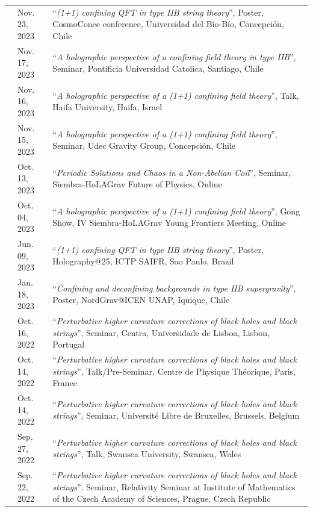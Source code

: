 \documentclass[11pt]{article}
\newenvironment{cvblock}[3]
{
\noindent
\begin{longtable}{p{#1}  >{\raggedright\arraybackslash}p{#2} p{#3}}
}
{
\end{longtable}
}
\newcommand{\cventry}[3]{\textbf{#1} & #2 & #3 \\ }
\newcommand{\talk}[2]{\small “\textit{#1}”, #2\vspace{0.2cm}}
\begin{document}
\begin{cvblock}{0cm}{2.3cm}{13cm}
	\cventry{}{\small Nov. 23, 2023}{\talk{(1+1) confining QFT in type IIB string theory}{Poster, CosmoConce conference, Universidad del Bío-Bío, Concepción, Chile}}

	\cventry{}{\small Nov. 17, 2023}{\talk{A holographic perspective of a confining field theory in type IIB}{Seminar, Pontificia Universidad Catolica, Santiago, Chile}}

	\cventry{}{\small Nov. 16, 2023}{\talk{A holographic perspective of a (1+1) confining field theory}{Talk, Haifa University, Haifa, Israel}}

	\cventry{}{\small Nov. 15, 2023}{\talk{A holographic perspective of a (1+1) confining field theory}{Seminar, Udec Gravity Group, Concepción, Chile}}

	\cventry{}{\small Oct. 13, 2023}{\talk{Periodic Solutions and Chaos in a Non-Abelian Coil}{Seminar, Siembra-HoLAGrav Future of Physics, Online}}

	\cventry{}{\small Oct. 04, 2023}{\talk{A holographic perspective of a (1+1) confining field theory}{Gong Show, IV Siembra-HoLAGrav Young Frontiers Meeting, Online}}

	\cventry{}{\small Jun. 09, 2023}{\talk{(1+1) confining QFT in type IIB string theory}{Poster, Holography@25, ICTP SAIFR, Sao Paulo, Brazil}}

	\cventry{}{\small Jan. 18, 2023}{\talk{Confining and deconfining backgrounds in type IIB supergravity}{Poster, NordGrav@ICEN UNAP, Iquique, Chile}}

	\cventry{}{\small Oct. 16, 2022}{\talk{Perturbative higher curvature corrections of black holes and black strings}{Seminar, Centra, Universidade de Lisboa, Lisbon, Portugal}}

	\cventry{}{\small Oct. 14, 2022}{\talk{Perturbative higher curvature corrections of black holes and black strings}{Talk/Pre-Seminar, Centre de Physique Théorique, Paris, France}}

	\cventry{}{\small Oct. 14, 2022}{\talk{Perturbative higher curvature corrections of black holes and black strings}{Seminar, Université Libre de Bruxelles, Brussels, Belgium}}

	\cventry{}{\small Sep. 27, 2022}{\talk{Perturbative higher curvature corrections of black holes and black strings}{Talk, Swansea University, Swansea, Wales}}

	\cventry{}{\small Sep. 22, 2022}{\talk{Perturbative higher curvature corrections of black holes and black strings}{Seminar, Relativity Seminar at Institute of Mathematics of the Czech Academy of Sciences, Prague, Czech Republic}}


\end{cvblock}
\end{document}
